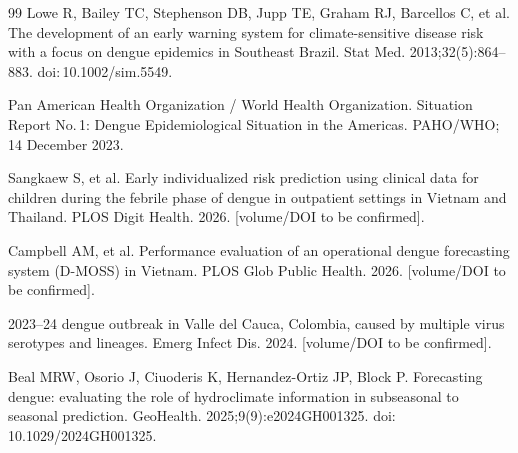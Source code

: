 \documentclass[11pt,a4paper]{article}
\begin{document}
\begin{thebibliography}{99}
 Lowe R, Bailey TC, Stephenson DB, Jupp TE, Graham RJ, Barcellos C, et al. The development of an early warning system for climate-sensitive disease risk with a focus on dengue epidemics in Southeast Brazil. Stat Med. 2013;32(5):864--883. doi:\,10.1002/sim.5549.

 Pan American Health Organization / World Health Organization. Situation Report No.\,1: Dengue Epidemiological Situation in the Americas. PAHO/WHO; 14 December 2023.

 Sangkaew S, et al. Early individualized risk prediction using clinical data for children during the febrile phase of dengue in outpatient settings in Vietnam and Thailand. PLOS Digit Health. 2026. [volume/DOI to be confirmed].

 Campbell AM, et al. Performance evaluation of an operational dengue forecasting system (D-MOSS) in Vietnam. PLOS Glob Public Health. 2026. [volume/DOI to be confirmed].

 2023--24 dengue outbreak in Valle del Cauca, Colombia, caused by multiple virus serotypes and lineages. Emerg Infect Dis. 2024. [volume/DOI to be confirmed].

 Beal MRW, Osorio J, Ciuoderis K, Hernandez-Ortiz JP, Block P. Forecasting dengue: evaluating the role of hydroclimate information in subseasonal to seasonal prediction. GeoHealth. 2025;9(9):e2024GH001325. doi:\,10.1029/2024GH001325.

\end{thebibliography}
\endgroup

\clearpage
\end{document}
